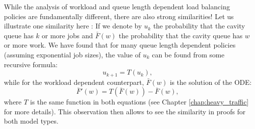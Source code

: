 \documentclass[12pt]{report}
\begin{document}
While the analysis of workload and queue length dependent load balancing policies are fundamentally different, there are also strong similarities! Let us illustrate one similarity here : If we denote by $u_k$ the probability that the cavity queue has $k$ or more jobs and $\bar F(w)$ the probability that the cavity queue has $w$ or more work. We have found that for many queue length dependent policies (assuming exponential job sizes), the value of $u_k$ can be found from some recursive formula:
$$
u_{k+1} = T(u_k),
$$
while for the workload dependent counterpart, $\bar F(w)$ is the solution of the ODE:
$$
\bar F'(w) = T(\bar F(w)) - \bar F(w),
$$
where $T$ is the same function in both equations (see Chapter \ref{chap:heavy_traffic} for more details). This observation then allows to see the similarity in proofs for both model types.
%
%
%
\end{document}
